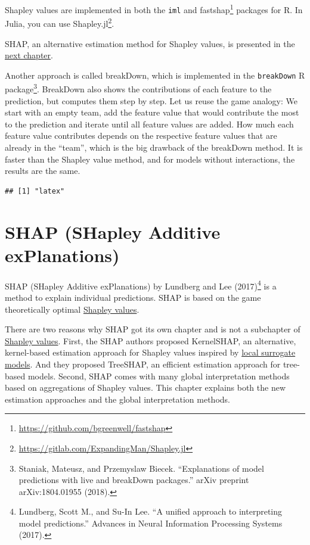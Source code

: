 \documentclass[
  11pt,
]{scrbook}
\renewcommand{\href}[2]{#2\footnote{\url{#1}}}
\begin{document}
Shapley values are implemented in both the \texttt{iml} and \href{https://github.com/bgreenwell/fastshap}{fastshap} packages for R.
In Julia, you can use \href{https://gitlab.com/ExpandingMan/Shapley.jl}{Shapley.jl}.

SHAP, an alternative estimation method for Shapley values, is presented in the \protect\hyperlink{shap}{next chapter}.

Another approach is called breakDown, which is implemented in the \texttt{breakDown} R package\footnote{Staniak, Mateusz, and Przemyslaw Biecek. ``Explanations of model predictions with live and breakDown packages.'' arXiv preprint arXiv:1804.01955 (2018).}.
BreakDown also shows the contributions of each feature to the prediction, but computes them step by step.
Let us reuse the game analogy:
We start with an empty team, add the feature value that would contribute the most to the prediction and iterate until all feature values are added.
How much each feature value contributes depends on the respective feature values that are already in the ``team'', which is the big drawback of the breakDown method.
It is faster than the Shapley value method, and for models without interactions, the results are the same.

\begin{verbatim}
## [1] "latex"
\end{verbatim}

\newpage

\hypertarget{shap}{%
\section{SHAP (SHapley Additive exPlanations)}\label{shap}}

SHAP (SHapley Additive exPlanations) by Lundberg and Lee (2017)\footnote{Lundberg, Scott M., and Su-In Lee. ``A unified approach to interpreting model predictions.'' Advances in Neural Information Processing Systems (2017).} is a method to explain individual predictions.
SHAP is based on the game theoretically optimal \protect\hyperlink{shapley}{Shapley values}.

There are two reasons why SHAP got its own chapter and is not a subchapter of \protect\hyperlink{shapley}{Shapley values}.
First, the SHAP authors proposed KernelSHAP, an alternative, kernel-based estimation approach for Shapley values inspired by \protect\hyperlink{lime}{local surrogate models}.
And they proposed TreeSHAP, an efficient estimation approach for tree-based models.
Second, SHAP comes with many global interpretation methods based on aggregations of Shapley values.
This chapter explains both the new estimation approaches and the global interpretation methods.
\end{document}

